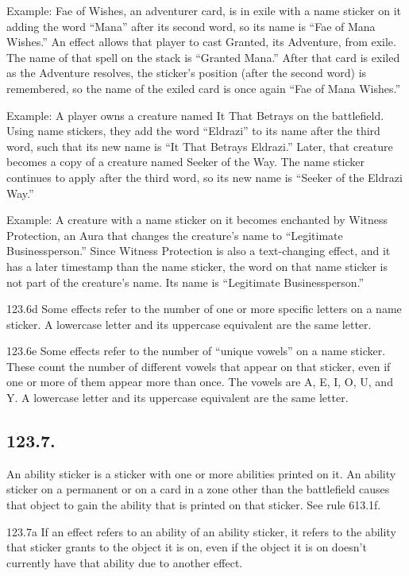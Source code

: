 Example: Fae of Wishes, an adventurer card, is in exile with a name sticker on it adding the word “Mana” after its second word, so its name is “Fae of Mana Wishes.” An effect allows that player to cast Granted, its Adventure, from exile. The name of that spell on the stack is “Granted Mana.” After that card is exiled as the Adventure resolves, the sticker’s position (after the second word) is remembered, so the name of the exiled card is once again “Fae of Mana Wishes.”

Example: A player owns a creature named It That Betrays on the battlefield. Using name stickers, they add the word “Eldrazi” to its name after the third word, such that its new name is “It That Betrays Eldrazi.” Later, that creature becomes a copy of a creature named Seeker of the Way. The name sticker continues to apply after the third word, so its new name is “Seeker of the Eldrazi Way.”

Example: A creature with a name sticker on it becomes enchanted by Witness Protection, an Aura that changes the creature’s name to “Legitimate Businessperson.” Since Witness Protection is also a text-changing effect, and it has a later timestamp than the name sticker, the word on that name sticker is not part of the creature’s name. Its name is “Legitimate Businessperson.”

123.6d Some effects refer to the number of one or more specific letters on a name sticker. A lowercase letter and its uppercase equivalent are the same letter.

123.6e Some effects refer to the number of “unique vowels” on a name sticker. These count the number of different vowels that appear on that sticker, even if one or more of them appear more than once. The vowels are A, E, I, O, U, and Y. A lowercase letter and its uppercase equivalent are the same letter.

\subsection*{123.7.}
An ability sticker is a sticker with one or more abilities printed on it. An ability sticker on a permanent or on a card in a zone other than the battlefield causes that object to gain the ability that is printed on that sticker. See rule 613.1f.

123.7a If an effect refers to an ability of an ability sticker, it refers to the ability that sticker grants to the object it is on, even if the object it is on doesn’t currently have that ability due to another effect.

